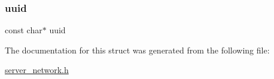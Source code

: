 \mbox{\label{structbt__server_a0873421d8da2b839db63d6f61cb10d16}} 
\subsubsection{\texorpdfstring{uuid}{uuid}}
{\footnotesize\ttfamily const char$\ast$ uuid}



The documentation for this struct was generated from the following file\+:\begin{DoxyCompactItemize}
\item 
\hyperlink{server__network_8h}{server\+\_\+network.\+h}\end{DoxyCompactItemize}
